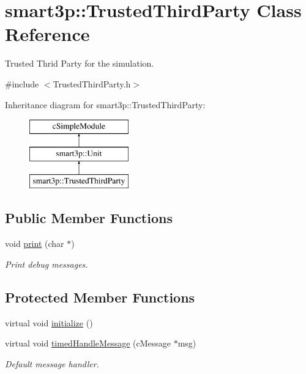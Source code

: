 \hypertarget{classsmart3p_1_1TrustedThirdParty}{}\section{smart3p\+:\+:Trusted\+Third\+Party Class Reference}
\label{classsmart3p_1_1TrustedThirdParty}


Trusted Thrid Party for the simulation.  




{\ttfamily \#include $<$Trusted\+Third\+Party.\+h$>$}

Inheritance diagram for smart3p\+:\+:Trusted\+Third\+Party\+:\begin{figure}[H]
\begin{center}
\leavevmode
\includegraphics[height=3.000000cm]{classsmart3p_1_1TrustedThirdParty}
\end{center}
\end{figure}
\subsection*{Public Member Functions}
\begin{DoxyCompactItemize}
\item 
void \hyperlink{classsmart3p_1_1TrustedThirdParty_aa6b9b6e4731061d43609acbf02ebbb81}{print} (char $\ast$)
\begin{DoxyCompactList}\small\item\em Print debug messages. \end{DoxyCompactList}\end{DoxyCompactItemize}
\subsection*{Protected Member Functions}
\begin{DoxyCompactItemize}
\item 
virtual void \hyperlink{classsmart3p_1_1TrustedThirdParty_a07be5c50d1ec6307e02c20ee9829d0e4}{initialize} ()
\item 
virtual void \hyperlink{classsmart3p_1_1TrustedThirdParty_adedb95022442b9c7f2bc1de5f4c17a76}{timed\+Handle\+Message} (c\+Message $\ast$msg)
\begin{DoxyCompactList}\small\item\em Default message handler. \end{DoxyCompactList}\end{DoxyCompactItemize}

